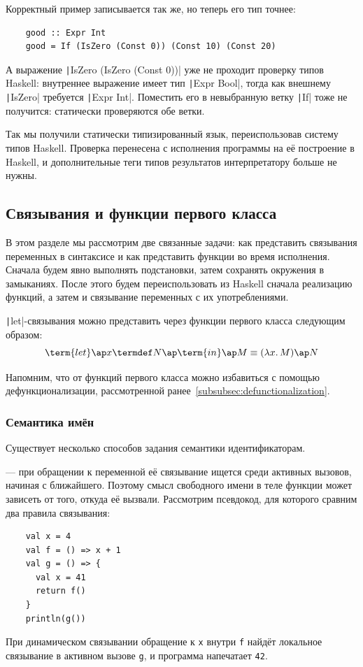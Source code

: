 Корректный пример записывается так же, но теперь его тип точнее:
\begin{verbatim}
    good :: Expr Int
    good = If (IsZero (Const 0)) (Const 10) (Const 20)
\end{verbatim}
А выражение \texttt|IsZero (IsZero (Const 0))| уже не проходит проверку типов Haskell: внутреннее выражение имеет тип \texttt|Expr Bool|, тогда как внешнему \texttt|IsZero| требуется \texttt|Expr Int|.
Поместить его в невыбранную ветку \texttt|If| тоже не получится: статически проверяются обе ветки.

Так мы получили статически типизированный язык, переиспользовав систему типов Haskell.
Проверка перенесена с исполнения программы на её построение в Haskell, и дополнительные теги типов результатов интерпретатору больше не нужны.

\subsection{Связывания и функции первого класса} \label{subsec:first-class-functions}

В этом разделе мы рассмотрим две связанные задачи: как представить связывания переменных в синтаксисе и как представить функции во время исполнения.
Сначала будем явно выполнять подстановки, затем сохранять окружения в замыканиях.
После этого будем переиспользовать из Haskell сначала реализацию функций, а затем и связывание переменных с их употреблениями.

\texttt|let|-связывания можно представить через функции первого класса следующим образом:
\[
    \term{let} \ap x \termdef N \ap \term{in} \ap M \equiv (\lambda x\ldotp M) \ap N
\]

Напомним, что от функций первого класса можно избавиться с помощью дефункционализации, рассмотренной ранее~\ref{subsubsec:defunctionalization}.

\subsubsection{Семантика имён} \label{subsubsec:name-bindings}

Существует несколько способов задания семантики идентификаторам.

 --- при обращении к переменной её связывание ищется среди активных вызовов, начиная с ближайшего.
Поэтому смысл свободного имени в теле функции может зависеть от того, откуда её вызвали.
Рассмотрим псевдокод, для которого сравним два правила связывания:
\begin{verbatim}
    val x = 4
    val f = () => x + 1
    val g = () => {
      val x = 41
      return f()
    }
    println(g())
\end{verbatim}
При динамическом связывании обращение к \texttt{x} внутри \texttt{f} найдёт локальное связывание в активном вызове \texttt{g}, и программа напечатает \texttt{42}.

